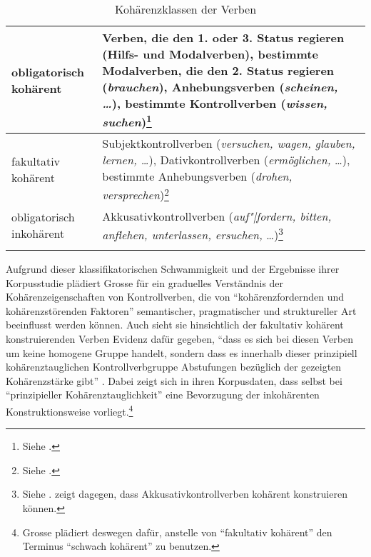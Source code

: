 {\setfootnoterule{0pt}
\begin{table}[ht]
\centering
\begin{tabular}{p{2.3cm}p{9cm}}
\lsptoprule
obligatorisch koh\"arent & Verben, die den 1. oder 3. Status regieren (Hilfs- und Modalverben), bestimmte Modalverben, die den 2. Status regieren ({\it brauchen}), Anhebungsverben ({\it scheinen, \ldots}), bestimmte Kontrollverben ({\it wissen, suchen})\footnote{Siehe \cite{Reis:01}.}\\
\midrule
fakultativ \mbox{kohärent} & Subjektkontrollverben ({\it versuchen, wagen, glauben, lernen, \ldots}), Dativkontrollverben ({\it ermöglichen,} \ldots), bestimmte Anhebungsverben ({\it drohen, versprechen})\footnote{Siehe \cite{Reis:05}.} \\
\midrule
obligatorisch inkohärent & Akkusativkontrollverben ({\it auf"|fordern, bitten, anflehen, unterlassen, ersuchen,} \ldots)\footnote{Siehe \citet[55]{Grosse:05}. \citet[Abschnitt~2.1.7]{Mueller:02} zeigt dagegen, dass Akkusativkontrollverben kohärent konstruieren können.} \\
\lspbottomrule
\end{tabular}
\caption{Kohärenzklassen der Verben\label{fig-kohaerenzklassen}}
\end{table}
}

\largerpage%
Aufgrund dieser klassifikatorischen Schwammigkeit und der Ergebnisse ihrer Korpusstudie plädiert Grosse für ein graduelles Verständnis der Kohärenzeigenschaften von Kontrollverben, die von "`kohärenzfordernden und kohärenzstörenden Faktoren"' semantischer, pragmatischer und struktureller Art beeinflusst werden können. Auch sieht sie hinsichtlich der fakultativ kohärent konstruierenden Verben Evidenz dafür gegeben, "`dass es sich bei diesen Verben um keine homogene Gruppe handelt, sondern dass es innerhalb dieser prinzipiell kohärenztauglichen Kontrollverbgruppe Abstufungen bezüglich der gezeigten Kohärenzstärke gibt"' \citep[11]{Grosse:05}. Dabei zeigt sich in ihren Korpusdaten, dass selbst bei "`prinzipieller Kohärenztauglichkeit"' eine Bevorzugung der  inkohärenten Konstruktionsweise vorliegt.\footnote{Grosse plädiert deswegen dafür, anstelle von "`fakultativ kohärent"' den Terminus "`schwach kohärent"' zu benutzen.} 

